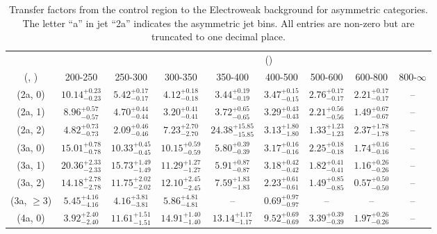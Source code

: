 \begin{table}[h!]
\tiny
\centering
\caption{Transfer factors from the \mmj control region to the Electroweak background for asymmetric categories. The letter ``a'' in jet \eg ``2a''  indicates the asymmetric jet bins. All entries are non-zero but are truncated to one decimal place.\label{tab:tf_mumu_total_asym}}
\begin{tabular}
{ccccccccc}
	\hline\hline
&	& \multicolumn{8}{c}{\scalht (\gev)} \\ 
	 (\njet,  \nb) & 200-250 & 250-300 & 300-350 & 350-400 & 400-500 & 500-600 & 600-800 & 800-$\infty$ \\ [0.8ex] 
\hline
	(2a, 0) & $10.14^{+ 0.23 }_{- 0.23 }$ & $5.42^{+ 0.17 }_{- 0.17 }$ & $4.12^{+ 0.18 }_{- 0.18 }$ & $3.44^{+ 0.19 }_{- 0.19 }$ & $3.47^{+ 0.15 }_{- 0.15 }$ & $2.76^{+ 0.17 }_{- 0.17 }$ & $2.21^{+ 0.17 }_{- 0.17 }$ & -- \\[0.5ex] 
	(2a, 1) & $8.96^{+ 0.57 }_{- 0.57 }$ & $4.70^{+ 0.44 }_{- 0.44 }$ & $3.20^{+ 0.41 }_{- 0.41 }$ & $3.72^{+ 0.65 }_{- 0.65 }$ & $3.29^{+ 0.43 }_{- 0.43 }$ & $2.21^{+ 0.56 }_{- 0.56 }$ & $1.49^{+ 0.67 }_{- 0.67 }$ & -- \\[0.5ex] 
	(2a, 2) & $4.82^{+ 0.73 }_{- 0.73 }$ & $2.09^{+ 0.46 }_{- 0.46 }$ & $7.23^{+ 2.70 }_{- 2.70 }$ & $24.38^{+ 15.85 }_{- 15.85 }$ & $3.13^{+ 1.80 }_{- 1.80 }$ & $1.33^{+ 1.23 }_{- 1.23 }$ & $2.37^{+ 1.78 }_{- 1.78 }$ & -- \\[0.5ex] 
	(3a, 0) & $15.01^{+ 0.78 }_{- 0.78 }$ & $10.33^{+ 0.45 }_{- 0.45 }$ & $10.15^{+ 0.59 }_{- 0.59 }$ & $5.80^{+ 0.39 }_{- 0.39 }$ & $3.17^{+ 0.16 }_{- 0.16 }$ & $2.25^{+ 0.18 }_{- 0.18 }$ & $1.74^{+ 0.16 }_{- 0.16 }$ & -- \\[0.5ex] 
	(3a, 1) & $20.36^{+ 2.33 }_{- 2.33 }$ & $15.73^{+ 1.49 }_{- 1.49 }$ & $11.29^{+ 1.27 }_{- 1.27 }$ & $5.91^{+ 0.87 }_{- 0.87 }$ & $3.18^{+ 0.42 }_{- 0.42 }$ & $1.82^{+ 0.41 }_{- 0.41 }$ & $1.16^{+ 0.26 }_{- 0.26 }$ & -- \\[0.5ex] 
	(3a, 2) & $14.18^{+ 2.78 }_{- 2.78 }$ & $11.75^{+ 2.02 }_{- 2.02 }$ & $12.10^{+ 2.45 }_{- 2.45 }$ & $7.59^{+ 1.83 }_{- 1.83 }$ & $2.23^{+ 0.61 }_{- 0.61 }$ & $1.49^{+ 0.85 }_{- 0.85 }$ & $0.57^{+ 0.50 }_{- 0.50 }$ & -- \\[0.5ex] 
	(3a, $\ge3$) & $5.45^{+ 4.16 }_{- 4.16 }$ & $4.16^{+ 3.81 }_{- 3.81 }$ & $5.86^{+ 4.81 }_{- 4.81 }$ & -- & $0.69^{+ 0.97 }_{- 0.97 }$ & -- & -- & -- \\[0.5ex] 
	(4a, 0) & $3.92^{+ 2.40 }_{- 2.40 }$ & $11.61^{+ 1.51 }_{- 1.51 }$ & $14.91^{+ 1.40 }_{- 1.40 }$ & $13.14^{+ 1.17 }_{- 1.17 }$ & $9.52^{+ 0.69 }_{- 0.69 }$ & $3.39^{+ 0.39 }_{- 0.39 }$ & $1.97^{+ 0.26 }_{- 0.26 }$ & -- \\[0.5ex] 

\end{tabular}
\end{table}
